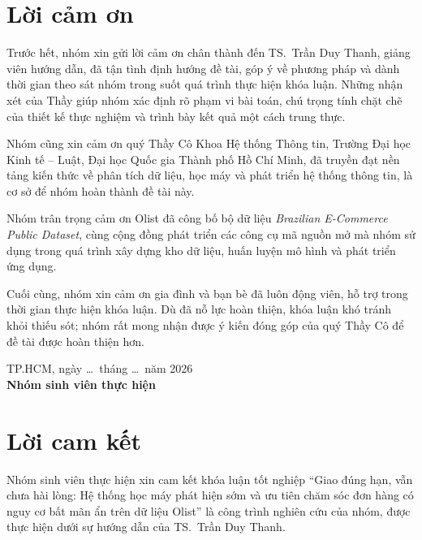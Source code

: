 \chapter*{Lời cảm ơn}

Trước hết, nhóm xin gửi lời cảm ơn chân thành đến TS.~Trần Duy Thanh, giảng viên hướng dẫn, đã tận tình định hướng đề tài, góp ý về phương pháp và dành thời gian theo sát nhóm trong suốt quá trình thực hiện khóa luận. Những nhận xét của Thầy giúp nhóm xác định rõ phạm vi bài toán, chú trọng tính chặt chẽ của thiết kế thực nghiệm và trình bày kết quả một cách trung thực.

Nhóm cũng xin cảm ơn quý Thầy Cô Khoa Hệ thống Thông tin, Trường Đại học Kinh tế -- Luật, Đại học Quốc gia Thành phố Hồ Chí Minh, đã truyền đạt nền tảng kiến thức về phân tích dữ liệu, học máy và phát triển hệ thống thông tin, là cơ sở để nhóm hoàn thành đề tài này.

Nhóm trân trọng cảm ơn Olist đã công bố bộ dữ liệu \emph{Brazilian E-Commerce Public Dataset}, cùng cộng đồng phát triển các công cụ mã nguồn mở mà nhóm sử dụng trong quá trình xây dựng kho dữ liệu, huấn luyện mô hình và phát triển ứng dụng.

Cuối cùng, nhóm xin cảm ơn gia đình và bạn bè đã luôn động viên, hỗ trợ trong thời gian thực hiện khóa luận. Dù đã nỗ lực hoàn thiện, khóa luận khó tránh khỏi thiếu sót; nhóm rất mong nhận được ý kiến đóng góp của quý Thầy Cô để đề tài được hoàn thiện hơn.

\vspace{1cm}
\begin{flushright}
\begin{minipage}{0.5\linewidth}\centering
TP.HCM, ngày \ldots\ tháng \ldots\ năm 2026\\
\textbf{Nhóm sinh viên thực hiện}
\end{minipage}
\end{flushright}

\chapter*{Lời cam kết}

Nhóm sinh viên thực hiện xin cam kết khóa luận tốt nghiệp ``Giao đúng hạn, vẫn chưa hài lòng: Hệ thống học máy phát hiện sớm và ưu tiên chăm sóc đơn hàng có nguy cơ bất mãn ẩn trên dữ liệu Olist'' là công trình nghiên cứu của nhóm, được thực hiện dưới sự hướng dẫn của TS.~Trần Duy Thanh.

